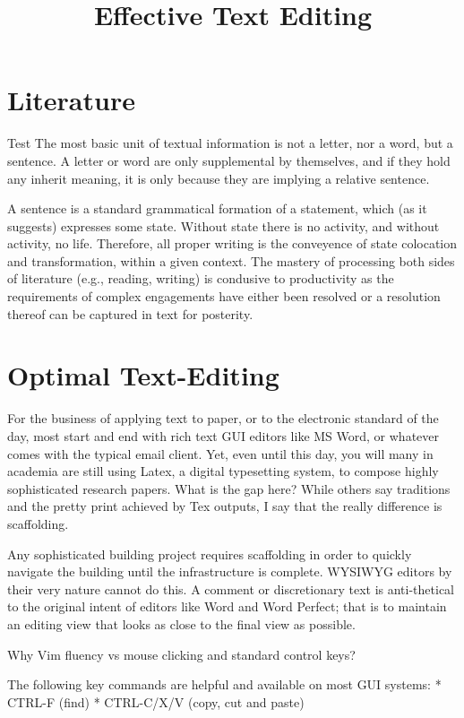 \documentclass{article}
\title{Effective Text Editing}
\begin{document}
\tableofcontents
\clearpage


\section{Literature}
Test The most basic unit of textual information is not a letter, nor a word, but a sentence.  A letter or word are only supplemental by themselves, and if they hold any inherit meaning, it is only because they are implying a relative sentence.

A sentence is a standard grammatical formation of a statement, which (as it suggests) expresses some state.  Without state there is no activity, and without activity, no life.  Therefore, all proper writing is the conveyence of state colocation and transformation, within a given context.  The mastery of processing both sides of literature (e.g., reading, writing) is condusive to productivity as the requirements of complex engagements have either been resolved or a resolution thereof can be captured in text for posterity.

\section{Optimal Text-Editing}

For the business of applying text to paper, or to the electronic standard of the day, most start and end with rich text GUI editors like MS Word, or whatever comes with the typical email client.  Yet, even until this day, you will many in academia are still using Latex, a digital typesetting system, to compose highly sophisticated research papers.  What is the gap here?  While others say traditions and the pretty print achieved by Tex outputs, I say that the really difference is scaffolding.

Any sophisticated building project requires scaffolding in order to quickly navigate the building until the infrastructure is complete.  WYSIWYG editors by their very nature cannot do this.  A comment or discretionary text is anti-thetical to the original intent of editors like Word and Word Perfect; that is to maintain an editing view that looks as close to the final view as possible.

Why Vim fluency vs mouse clicking and standard control keys?

The following key commands are helpful and available on most GUI systems:
* CTRL-F (find)
* CTRL-C/X/V (copy, cut and paste)
\end{document}
